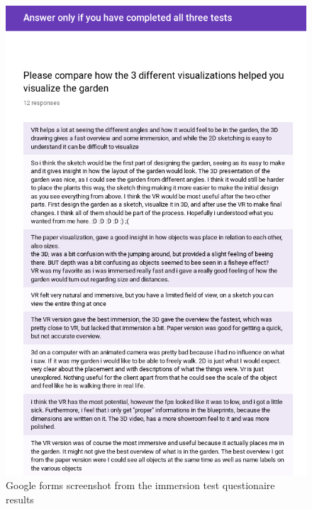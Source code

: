 \begin{multicols}{2}
\begin{figure}[H]
		\includegraphics[width=1.0\linewidth]{include/Appendices/immersionQuestionnaire/7.png}
		\caption{Google forms screenshot from the immersion test questionaire results}
	\end{figure}
	\begin{figure}[H]

\end{figure}
\end{multicols}

